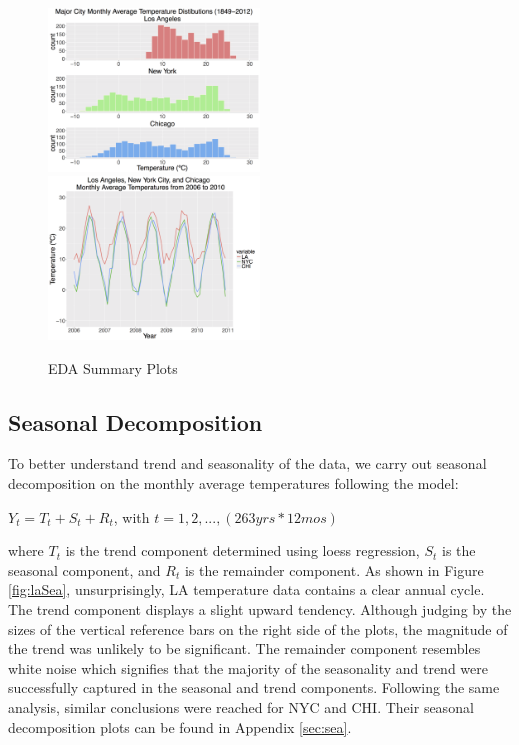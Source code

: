 \documentclass[12pt]{article}
\begin{document}
\begin{figure}[H]
    \includegraphics[width=0.5\textwidth]{Figures/cityHist.png}
    \includegraphics[width=0.5\textwidth]{Figures/cityLine.png}
    \label{fig:citySum}
    \caption{EDA Summary Plots}
\end{figure}


\subsection{Seasonal Decomposition}
To better understand trend and seasonality of the data, we carry out seasonal decomposition on the monthly average temperatures following the model:

\vspace{0.2cm}
\noindent $Y_t = T_t + S_t + R_t$, with $t = 1, 2, ..., (263 yrs * 12 mos)$

\vspace{0.2cm}
\noindent where $T_t$ is the trend component determined using loess regression, $S_t$ is the seasonal component, and $R_t$ is the remainder component. As shown in Figure \ref{fig:laSea}, unsurprisingly, LA temperature data contains a clear annual cycle. The trend component displays a slight upward tendency. Although judging by the sizes of the vertical reference bars on the right side of the plots, the magnitude of the trend was unlikely to be significant. The remainder component resembles white noise which signifies that the majority of the seasonality and trend were successfully captured in the seasonal and trend components. Following the same analysis, similar conclusions were reached for NYC and CHI. Their seasonal decomposition plots can be found in Appendix \ref{sec:sea}.
\end{document}
